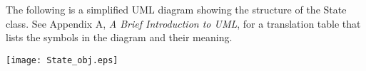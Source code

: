 
\pagebreak


The following is a simplified UML diagram showing the structure of the
State class.  See Appendix A, {\it A Brief Introduction to UML},
for a translation table that lists the symbols in the diagram and their 
meaning.

\begin{center}
\texttt{[image: State\_obj.eps]}   
\end{center}
